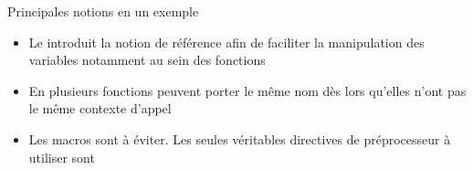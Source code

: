 \documentclass[c]{beamer}
\begin{document}

\begin{frame}[fragile]{Principales notions en un exemple}
 \begin{itemize}
\item Le \Cpp introduit la notion de référence afin de faciliter la manipulation des
variables notamment au sein des fonctions

\begin{center}
\end{center}
\end{itemize}

\pause

\begin{itemize}
\item En \Cpp plusieurs fonctions peuvent porter le même nom dès lors qu'elles n'ont
pas le même contexte d'appel

\begin{center}
\end{center}
\end{itemize}

\pause

\begin{itemize}
\item Les macros sont à éviter. Les seules véritables directives de préprocesseur à
utiliser sont 

\begin{center}
\end{center}
\end{itemize}
\end{frame}


\end{document}
